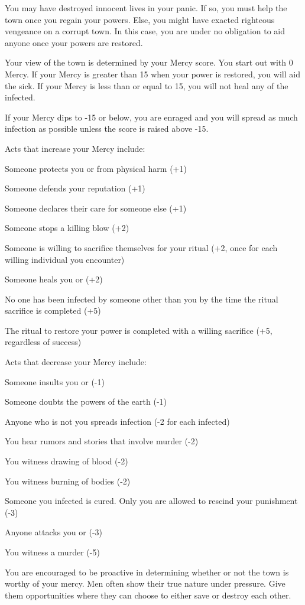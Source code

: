 \documentclass[green]{Pestilence}
\begin{document}
\name{\gMercy{}}

You may have destroyed innocent lives in your panic. If so, you must help the town once you regain your powers. Else, you might have exacted righteous vengeance on a corrupt town. In this case, you are under no obligation to aid anyone once your powers are restored.

Your view of the town is determined by your Mercy score. You start out with 0 Mercy. If your Mercy is greater than 15 when your power is restored, you will aid the sick. If your Mercy is less than or equal to 15, you will not heal any of the infected. 

If your Mercy dips to -15 or below, you are enraged and you will spread as much infection as possible unless the score is raised above -15.

Acts that increase your Mercy include:

\begin{itemz}
	\item Someone protects you or \cShaman{} from physical harm (+1)
	\item Someone defends your reputation (+1)
	\item Someone declares their care for someone else (+1)
	\item Someone stops a killing blow (+2)
	\item Someone is willing to sacrifice themselves for your ritual (+2, once for each willing individual you encounter)
	\item Someone heals you or \cShaman{} (+2)
	\item No one has been infected by someone other than you by the time the ritual sacrifice is completed (+5)
	\item The ritual to restore your power is completed with a willing sacrifice (+5, regardless of success)
\end{itemz}

Acts that decrease your Mercy include:

\begin{itemz}
	\item Someone insults you or \cShaman{} (-1)
	\item Someone doubts the powers of the earth (-1)
	\item Anyone who is not you spreads infection (-2 for each infected)
	\item You hear rumors and stories that involve murder (-2)
	\item You witness drawing of blood (-2)
	\item You witness burning of bodies (-2)
	\item Someone you infected is cured. Only you are allowed to rescind your punishment (-3)
	\item Anyone attacks you or \cShaman{} (-3)
	\item You witness a murder (-5)
\end{itemz}

You are encouraged to be proactive in determining whether or not the town is worthy of your mercy. Men often show their true nature under pressure. Give them opportunities where they can choose to either save or destroy each other.
\end{document}
